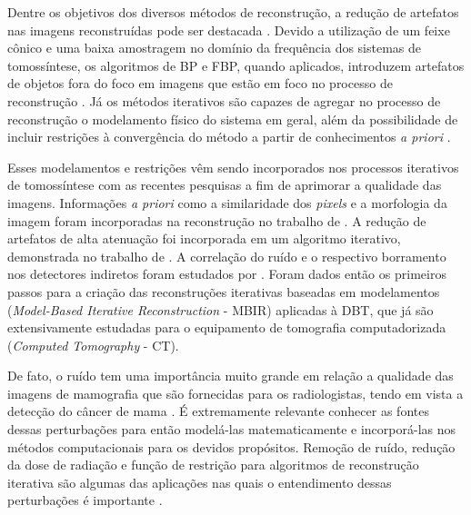 Dentre os objetivos dos diversos métodos de reconstrução, a redução de artefatos nas imagens reconstruídas pode ser destacada \cite{hu2008image}. Devido a utilização de um feixe cônico e uma baixa amostragem no domínio da frequência dos sistemas de tomossíntese, os algoritmos de \acs{BP} e \acs{FBP}, quando aplicados, introduzem artefatos de objetos fora do foco em imagens que estão em foco no processo de reconstrução \cite[]{levakhina2013weighted, borges2017metal}. Já os métodos iterativos são capazes de agregar no processo de reconstrução o modelamento físico do sistema em geral, além da possibilidade de incluir restrições à convergência do método a partir de conhecimentos \textit{a priori} \cite{xu2015statistical,levakhina2013weighted}.

Esses modelamentos e restrições vêm sendo incorporados nos processos iterativos de tomossíntese com as recentes pesquisas a fim de aprimorar a qualidade das imagens. Informações \textit{a priori} como a similaridade dos \textit{pixels} e a morfologia da imagem foram incorporadas na reconstrução no trabalho de . A redução de artefatos de alta atenuação foi incorporada em um algoritmo iterativo, demonstrada no trabalho de . A correlação do ruído e o respectivo borramento nos detectores indiretos foram estudados por . Foram dados então os primeiros passos para a criação das reconstruções iterativas baseadas em modelamentos (\textit{Model-Based Iterative Reconstruction }- \acs{MBIR}) aplicadas à \acs{DBT}, que já são extensivamente estudadas para o equipamento de tomografia computadorizada (\textit{Computed Tomography} - \acs{CT}).    

De fato, o ruído tem uma importância muito grande em relação a qualidade das imagens de mamografia que são fornecidas para os radiologistas, tendo em vista a detecção do câncer de mama \cite{haus2000screen,huda2003experimental,ruschin2007dose, saunders2007does, samei2007digital, mackenzie2016relationship}. É extremamente relevante conhecer as fontes dessas perturbações para então modelá-las matematicamente e incorporá-las nos métodos computacionais para os devidos propósitos. Remoção de ruído, redução da dose de radiação e função de restrição para algoritmos de reconstrução iterativa são algumas das aplicações nas quais o entendimento dessas perturbações é importante \cite{wu2012dose, romualdo2013mammographic,borges2016method,borges2017pipeline,borges2017method,mackenzie2017characterisation,zheng2018detector}.

